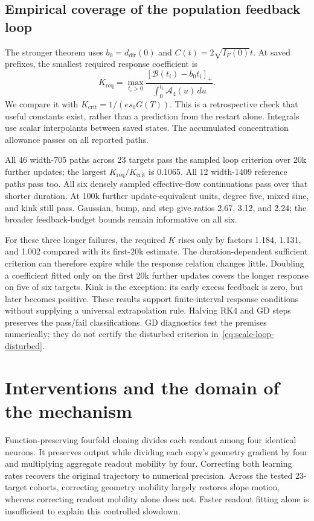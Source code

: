 \subsection{Empirical coverage of the population feedback loop}
The stronger theorem uses $b_0=d_{\mathrm{dir}}(0)$ and
$C(t)=2\sqrt{I_F(0)}t$. At saved prefixes, the smallest required response
coefficient is
\begin{equation}
K_{\mathrm{req}}=\max_{t_i>0}
\frac{[\mathcal B(t_i)-b_0t_i]_+}
{\int_0^{t_i}\mathcal A_4(u)\,du}.
\end{equation}
We compare it with $K_{\mathrm{crit}}=1/(e s_0G(T))$. This is a
retrospective check that useful constants exist, rather than a prediction
from the restart alone. Integrals use scalar interpolants between saved
states. The accumulated concentration allowance passes on all reported paths.

All 46 width-705 paths across 23 targets pass the sampled loop criterion
over 20k further updates; the largest $K_{\mathrm{req}}/K_{\mathrm{crit}}$
is 0.1065. All 12 width-1409 reference paths pass too. All six densely
sampled effective-flow continuations pass over that shorter duration.
At 100k further update-equivalent units, degree five, mixed sine, and kink
still pass. Gaussian, bump, and step give ratios 2.67, 3.12, and 2.24;
the broader feedback-budget bounds remain informative on all six.

For these three longer failures, the required $K$ rises only by factors
1.184, 1.131, and 1.002 compared with its first-20k estimate. The
duration-dependent sufficient criterion can therefore expire while the
response relation changes little. Doubling a coefficient fitted only on
the first 20k further updates covers the longer response on five of six
targets. Kink is the exception: its early excess feedback is zero, but
later becomes positive. These results support finite-interval response
conditions without supplying a universal extrapolation rule. Halving RK4
and GD steps preserves the pass/fail classifications. GD diagnostics test
the premises numerically; they do not certify the disturbed criterion
in~\eqref{eq:scale-loop-disturbed}.

\FloatBarrier
\section{Interventions and the domain of the mechanism}
\label{app:scale-interventions}
Function-preserving fourfold cloning divides each readout among four
identical neurons. It preserves output while dividing each copy's geometry
gradient by four and multiplying aggregate readout mobility by four.
Correcting both learning rates recovers the original trajectory to numerical
precision. Across the tested 23-target cohorts, correcting geometry mobility
largely restores slope motion, whereas correcting readout mobility alone
does not. Faster readout fitting alone is insufficient to explain this
controlled slowdown.

